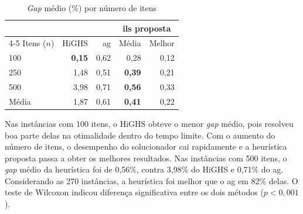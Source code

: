 \begin{table}[htbp]
  \centering
  \caption{\emph{Gap} médio (\%) por número de itens}
  \label{tab:resultados}
  \small
  \begin{tabular}{@{}lrrrr@{}}
    \toprule
    & & & \multicolumn{2}{c}{\acs{ils} proposta} \\
    \cmidrule(l){4-5}
    Itens ($n$) & HiGHS & \acs{ag} & Média & Melhor \\
    \midrule
    100   & \textbf{0,15} & 0,62 & 0,28          & 0,12 \\
    250   & 1,48          & 0,51 & \textbf{0,39} & 0,21 \\
    500   & 3,98          & 0,71 & \textbf{0,56} & 0,33 \\
    \midrule
    Média & 1,87          & 0,61 & \textbf{0,41} & 0,22 \\
    \bottomrule
  \end{tabular}
\end{table}

Nas instâncias com 100 itens, o HiGHS obteve o menor \emph{gap} médio, pois
resolveu boa parte delas na otimalidade dentro do tempo limite. Com o aumento
do número de itens, o desempenho do solucionador cai rapidamente e a
heurística proposta passa a obter os melhores resultados. Nas instâncias com
500 itens, o \emph{gap} médio da heurística foi de 0,56\%, contra 3,98\% do
HiGHS e 0,71\% do \acs{ag}. Considerando as 270 instâncias, a heurística foi
melhor que o \acs{ag} em 82\% delas. O teste de Wilcoxon indicou diferença
significativa entre os dois métodos ($p < 0,001$).

